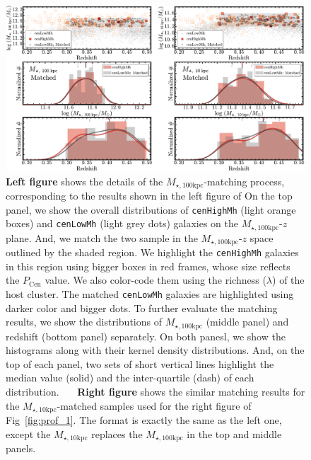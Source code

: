 \documentclass{emulateapj}
\def\rbcg{\texttt{cenHighMh}}
\def\nbcg{\texttt{cenLowMh}}
\def\minn{{$M_{\star,10\mathrm{kpc}}$}}
\def\mtot{{$M_{\star,100\mathrm{kpc}}$}}
\begin{document}
\begin{CJK*}{UTF8}{gbsn}
\begin{figure}[hbt!]
    \centering 
    \includegraphics[width=\textwidth]{fig/redbcg_match}
    \caption{
        \textbf{Left figure} shows the details of the \mtot{}-matching process, 
        corresponding to the results shown in the left figure of   
        On the top panel, we show the overall distributions of \rbcg{} (light orange boxes) 
        and \nbcg{} (light grey dots) galaxies on the \mtot{}-$z$ plane.  
        And, we match the two sample in the \mtot{}-$z$ space outlined by the shaded region.
        We highlight the \rbcg{} galaxies in this region using bigger boxes in red frames, 
        whose size reflects the $P_{\mathrm{Cen}}$ value.  
        We also color-code them using the richness ($\lambda$) of the host cluster. 
        The matched \nbcg{} galaxies are highlighted using darker color and bigger dots. 
        To further evaluate the matching results, we show the distributions of \mtot{} 
        (middle panel) and redshift (bottom panel) separately. 
        On both panesl, we show the histograms along with their kernel density 
        distributions.  
        And, on the top of each panel, two sets of short vertical lines highlight the median 
        value (solid) and the inter-quartile (dash) of each distribution.~~~
        \textbf{Right figure} shows the similar matching results for the \minn{}-matched
        samples used for the right figure of Fig~\ref{fig:prof_1}.
        The format is exactly the same as the left one, except the \minn{} replaces the 
        \mtot{} in the top and middle panels.}
    \label{fig:match}
\end{figure}
    

\end{CJK*}
\end{document}

